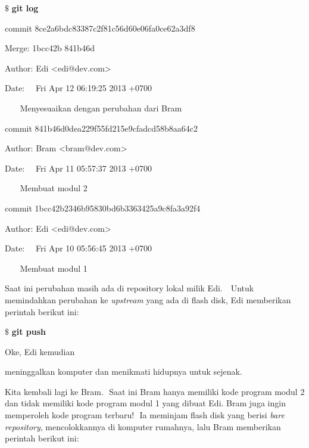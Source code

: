 \noindent 
 $  \$  $ \textbf{git log} \par
\noindent 
commit 8ce2a6bdc83387c2f81c56d60e06fa0ce62a3df8 \par
\noindent 
Merge: 1bcc42b 841b46d \par
\noindent 
Author: Edi <edi@dev.com> \par
\noindent 
Date:~~ Fri Apr 12 06:19:25 2013 +0700 \par
\noindent 
\vspace{12pt}
\noindent 
~~~ Menyesuaikan dengan perubahan dari Bram \par
\noindent 
\vspace{12pt}
\noindent 
commit 841b46d0dea229f55fd215e9cfadcd58b8aa64c2 \par
\noindent 
Author: Bram <bram@dev.com> \par
\noindent 
Date:~~ Fri Apr 11 05:57:37 2013 +0700 \par
\noindent 
\vspace{12pt}
\noindent 
~~~ Membuat modul 2 \par
\noindent 
\vspace{12pt}
\noindent 
commit 1bcc42b2346b95830bd6b3363425a9c8fa3a92f4 \par
\noindent 
Author: Edi <edi@dev.com> \par
\noindent 
Date:~~ Fri Apr 10 05:56:45 2013 +0700 \par
\noindent 
\vspace{12pt}
\noindent 
~~~ Membuat modul 1 \par
\noindent 
\vspace{12pt}
\noindent 
Saat ini perubahan masih ada di repository lokal milik Edi. $  $ $  $ Untuk memindahkan perubahan ke \textit{upstream} yang ada di flash disk, Edi memberikan perintah berikut ini: \par
\vspace{12pt}
\noindent 
 $  \$  $ \textbf{git push} \par
\noindent 
Oke, Edi kemudian  \par
\noindent 
meninggalkan komputer dan menikmati hidupnya untuk sejenak. \par
\noindent 
Kita kembali lagi ke Bram. $  $ Saat ini Bram hanya memiliki kode program modul 2 dan tidak memiliki kode program modul 1 yang dibuat Edi. Bram juga ingin memperoleh kode program terbaru! $  $ Ia meminjam flash disk yang berisi \textit{bare repository}, mencolokkannya di komputer rumahnya, lalu Bram memberikan perintah berikut ini: \par
